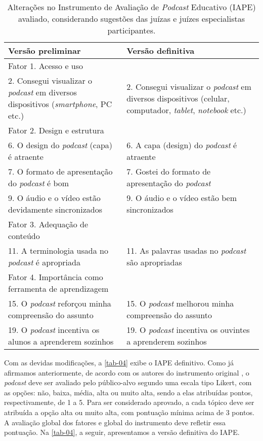 \begin{table}[htbp]
\small
\centering
\caption{Alterações no Instrumento de Avaliação de \textit{Podcast} Educativo (IAPE) avaliado, considerando sugestões das juízas e juízes especialistas participantes.}
\label{tab-03}
\begin{threeparttable}
\begin{tabular}{p{} p{}}
\toprule
Versão preliminar & Versão definitiva\\ 
\midrule
Fator 1. Acesso e uso & \\
2. Consegui visualizar o \textit{podcast} em diversos dispositivos (\textit{smartphone}, PC etc.) & 2. Consegui visualizar o \textit{podcast} em diversos dispositivos (celular, computador, \textit{tablet}, \textit{notebook} etc.)\\

Fator 2. Design e estrutura & \\
6. O design do \textit{podcast} (capa) é atraente & 6. A capa (design) do \textit{podcast} é atraente\\ 
7. O formato de apresentação do \textit{podcast} é bom & 7. Gostei do formato de apresentação do \textit{podcast}\\
9. O áudio e o vídeo estão devidamente sincronizados & 9. O áudio e o vídeo estão bem sincronizados\\

Fator 3. Adequação de conteúdo &\\
11. A terminologia usada no \textit{podcast} é apropriada & 11. As palavras usadas no \textit{podcast} são apropriadas\\ 

Fator 4. Importância como ferramenta de aprendizagem & \\
15. O \textit{podcast} reforçou minha compreensão do assunto & 15. O \textit{podcast} melhorou minha compreensão do assunto\\
19. O \textit{podcast} incentiva os alunos a aprenderem sozinhos  & 19. O \textit{podcast} incentiva os ouvintes a aprenderem sozinhos\\
\bottomrule
\end{tabular}
\end{threeparttable}
\end{table}

Com as devidas modificações, a \cref{tab-04} exibe o IAPE definitivo. Como já
afirmamos anteriormente, de acordo com os autores do instrumento original
\cite{alarcon2017,alarcon2020}, o \textit{podcast} deve ser avaliado pelo
público-alvo segundo uma escala tipo Likert, com as opções: não, baixa, média,
alta ou muito alta, sendo a elas atribuídas pontos, respectivamente, de 1 a 5.
Para ser considerado aprovado, a cada tópico deve ser atribuída a opção alta ou
muito alta, com pontuação mínima acima de 3 pontos. A avaliação global dos
fatores e global do instrumento deve refletir essa pontuação. Na \cref{tab-04},
a seguir, apresentamos a versão definitiva do IAPE.

